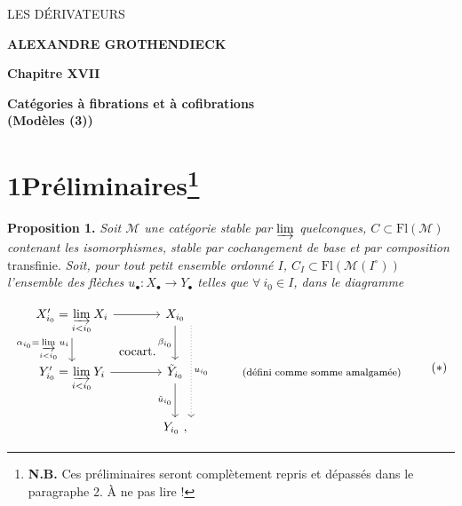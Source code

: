 \documentclass[11pt]{article}
\newcommand{\printedpage}[1]{\marginpar{\footnotesize p.~#1}}
\newcommand{\msp}[1]{\marginpar{\footnotesize [#1]}}
\newcommand{\Fl}{\mathrm{Fl}}
\begin{document}
\printedpage{--}

\begin{center}
\vspace*{5cm}

{\Large\textsf{LES DÉRIVATEURS}}

\bigskip

\textbf{ALEXANDRE GROTHENDIECK}

\vspace{2cm}

\textbf{Chapitre XVII}

\medskip

\textbf{Catégories à fibrations et à cofibrations}\\
\textbf{(Modèles (3))}
\end{center}

\clearpage


\printedpage{1}

\msp{page 1}

\section*{1\quad Préliminaires\footnote{\textbf{N.B.} Ces préliminaires seront complètement repris et dépassés dans le paragraphe 2. À ne pas lire !}}

\textbf{Proposition 1.} \textit{Soit $\mathcal{M}$ une catégorie stable par $\varinjlim$ quelconques, $C \subset \Fl(\mathcal{M})$ contenant les isomorphismes, stable par cochangement de base et par composition} transfinie. \textit{Soit, pour tout petit ensemble ordonné $I$, $C_I \subset \Fl(\mathcal{M}(I^{\circ}))$ l'ensemble des flèches $u_\bullet : X_\bullet \longrightarrow Y_\bullet$ telles que $\forall\ i_0 \in I$, dans le diagramme} %

\[
\begin{tikzcd}[column sep=large]
X'_{i_0} = \varinjlim\limits_{i<i_0} X_i \arrow[r] \arrow[d, "\alpha_{i_0} = \varinjlim\limits_{i<i_0} u_i"'] \arrow[dr, phantom, "\text{cocart.}"] & X_{i_0} \arrow[d, "\beta_{i_0}"'] \arrow[dd, dotted, shift left=3ex, "u_{i_0}"] & \\
Y'_{i_0} = \varinjlim\limits_{i<i_0} Y_i \arrow[r] & \tilde{Y}_{i_0} \arrow[d, "\tilde{u}_{i_0}"'] & \text{\footnotesize (défini comme somme amalgamée)} \\
& Y_{i_0}\ , &
\end{tikzcd}
\tag*{$(*)$}
\]
\end{document}
